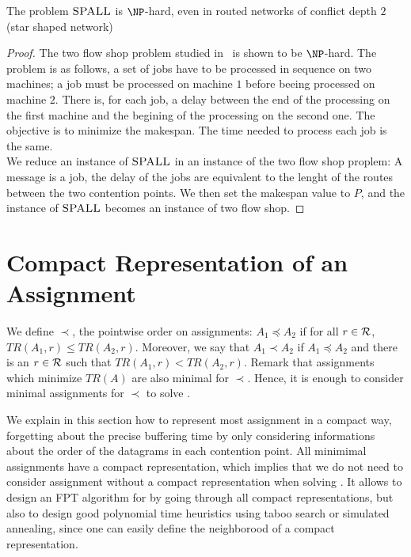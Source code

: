  \begin{theorem}\label{th:spallHard}
The problem $\textsc{SPALL}$ is $\NP$-hard, even in routed networks of conflict depth $2$ (star shaped network)
\end{theorem}
\begin{proof}
The two flow shop problem studied in~\cite{yu2004minimizing} is shown to be $\NP$-hard. The problem is as follows, a set of jobs have to be processed in sequence on two machines; a job must be processed on machine $1$ before beeing processed on machine $2$. There is, for each job, a delay between the end of the processing on the first machine and the begining of the processing on the second one. The objective is to minimize the makespan. The time needed to process each job is the same.\\
We reduce an instance of $\textsc{SPALL}$ in an instance of the two flow shop proplem: A message is a job, the delay of the jobs are equivalent to the lenght of the routes between the two contention points. We then set the makespan value to $P$, and the instance of $\textsc{SPALL}$ becomes an instance of two flow shop.
\end{proof}




\section{Compact Representation of an Assignment}

 We define $\prec$, the pointwise order on assignments: $A_1 \preceq A_2$ if for all $r\in \cal{R}$, $TR(A_1,r) \leq TR(A_2,r)$. Moreover, we say that $A_1 \prec A_2$ if $A_1 \preceq A_2$ and there is an $r \in \cal {R}$ such that  $TR(A_1,r) < TR(A_2,r)$. Remark that assignments which minimize $TR(A)$ are also minimal for $\prec$. Hence, it is enough to consider minimal assignments for $\prec$ to solve \spall.

We explain in this section how to represent most assignment in a compact way, forgetting about the precise buffering time by only considering informations about the order of the datagrams in each contention point. All minimimal assignments have a compact representation, which implies that we do not need to consider assignment without a compact representation when solving \spall. 
It allows to design an FPT algorithm for \spall by going through all compact representations, but also to design good polynomial time heuristics using taboo search or simulated annealing, since one can easily define the neighborood of a compact representation.


